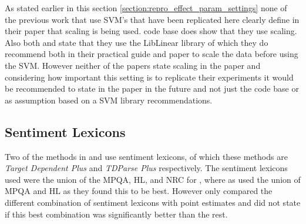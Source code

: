 As stated earlier in this section \ref{section:repro_effect_param_settings} none of the previous work that use SVM's that have been replicated here clearly define in their paper that scaling is being used. \citet{repro_wang_2017} code base does show that they use scaling. Also both \citet{repro_vo_2015} and \citet{repro_wang_2017} state that they use the LibLinear library \citep{repro_fan_2008} of which they do recommend both in their practical guide \citep{repro_hsu_2003} and paper \citep{repro_fan_2008} to scale the data before using the SVM. However neither of the papers state scaling in the paper and considering how important this setting is to replicate their experiments it would be recommended to state in the paper in the future and not just the code base or as assumption based on a SVM library recommendations.
\newpage
\FloatBarrier
\subsection{Sentiment Lexicons}
Two of the methods in \citet{repro_vo_2015} and \citet{repro_wang_2017} use sentiment lexicons, of which these methods are \textit{Target Dependent Plus} and \textit{TDParse Plus} respectively. The sentiment lexicons used were the union of the MPQA, HL, and NRC for \citet{repro_wang_2017}, where as \citet{repro_vo_2015} used the union of MPQA and HL as they found this to be best. However \citet{repro_vo_2015} only compared the different combination of sentiment lexicons with point estimates and did not state if this best combination was significantly better than the rest.

